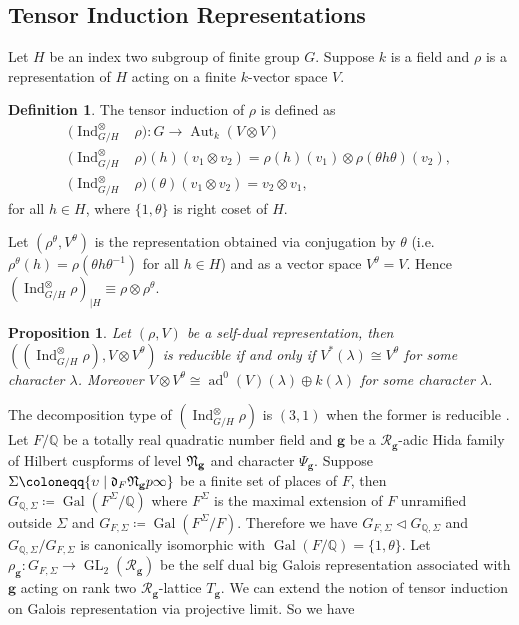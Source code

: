 \documentclass[10pt]{amsart}
\numberwithin{equation}{section}
\newtheorem{prop}[thm]{Proposition}
\theoremstyle{definition}
\newtheorem{defn}[thm]{Definition}
\theoremstyle{remark} %
\newcommand{\ad}{\operatorname{ad}}
\newcommand{\Gal}{\operatorname{Gal}}
\newcommand{\GL}[1]{\operatorname{GL}_{#1}}
\newcommand{\Ind}{\operatorname{Ind}}
\newcommand{\g}{\mathbf{g}}
\newcommand{\Q}{\mathbb{Q}}
\newcommand{\R}{\mathcal{R}}
\begin{document}
	\subsection{Tensor Induction Representations}
	\label{sec2.4}
	Let $ H $ be an index two subgroup of finite group $ G $. Suppose $ k $ is a field and $ \rho $ is a representation of $H$ acting on a finite $ k $-vector space $ V $. 
	\begin{defn}
		The tensor induction of $ \rho $ is defined as 
		\begin{align*} (\Ind^{\otimes}_{G/H} &\rho) \colon G \rightarrow \operatorname{Aut}_k(V \otimes V) \\
			(\Ind^{\otimes}_{G/H} &\rho)(h)(v_1\otimes v_2)  = \rho(h)(v_1) \otimes \rho(\theta h \theta)(v_2), \\
			(\Ind^{\otimes}_{G/H} &\rho)(\theta)(v_1\otimes v_2)  = v_2 \otimes v_1,
		\end{align*}
		for all $ h \in H $, where $ \{1, \theta \} $ is right coset of $ H $.
	\end{defn}
	Let $ (\rho^{\theta},V^{\theta}) $ is the representation obtained via conjugation by $ \theta $ (i.e. $ \rho^\theta(h) = \rho(\theta h \theta^{-1} ) $ for all $ h \in H $) and as a vector space $ V^\theta =V $. Hence $ (\Ind^{\otimes}_{G/H} \rho)_{\mid H} \equiv \rho\otimes \rho^\theta $.
	\begin{prop}
		Let $ (\rho, V) $ be a self-dual representation, then $ \left((\Ind^{\otimes}_{G/H} \rho),V \otimes V^{\theta}\right) $ is reducible if and only if $V^*(\lambda)  \cong V^{\theta}$ for some character $ \lambda $. Moreover $ V \otimes V^{\theta} \cong \ad^0(V)(\lambda) \oplus k(\lambda) $ for some character $ \lambda $.
	\end{prop}
	The decomposition type of $ (\Ind^{\otimes}_{G/H} \rho)$ is $ (3,1) $ when the former is reducible	\cite[Proposition 2.3]{For19}. 
	Let $ F/\Q $ be a totally real quadratic number field and $ \g $ be a $ \R_\g $-adic Hida family of Hilbert cuspforms of level $ \frak{N}_{\g} $ and character $ \Psi_{\g} $. Suppose 
	$ \Sigma \coloneqq \{\upsilon \mid \frak{d}_F \frak{N}_{\g}p\infty \} $
	be a finite set of places of $ F $, then $ G_{\Q, \Sigma}\coloneqq \Gal(F^{\Sigma}/\Q) $ where $ F^\Sigma $ is the maximal extension of $ F $ unramified outside $ \Sigma$ and $ G_{F, \Sigma}\coloneqq \Gal(F^{\Sigma}/F) $. Therefore we have $ G_{F,\Sigma} \triangleleft G_{\Q, \Sigma}$ and $ G_{\Q, \Sigma}/G_{F,\Sigma} $ is canonically isomorphic with $ \Gal(F/\Q) =\{1,\theta\} $. Let $ \rho_{\g} \colon G_{F,\Sigma} \rightarrow \GL{2}(\R_{\g}) $ be the self dual big Galois representation associated with $ \g $ acting on rank two $ \R_\g $-lattice $ T_\g $. We can extend the notion of tensor induction on Galois representation via projective limit. So we have
\end{document}
